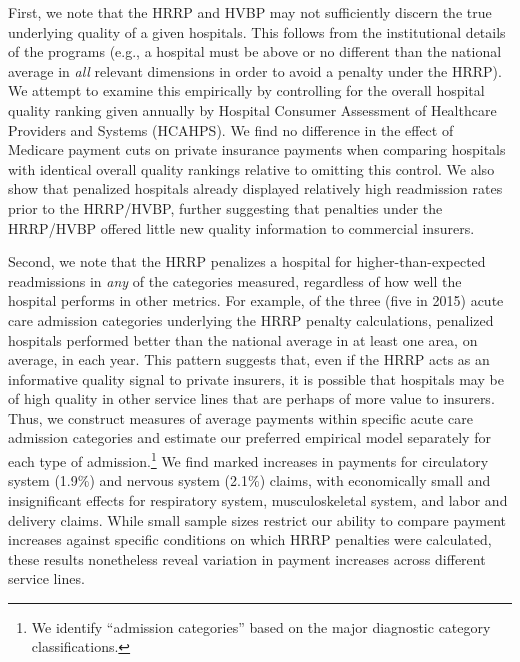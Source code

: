 \documentclass[12pt]{article}
\begin{document}
First, we note that the HRRP and HVBP may not sufficiently discern the true underlying quality of a given hospitals. This follows from the institutional details of the programs (e.g., a hospital must be above or no different than the national average in \textit{all} relevant dimensions in order to avoid a penalty under the HRRP). We attempt to examine this empirically by controlling for the overall hospital quality ranking given annually by Hospital Consumer Assessment of Healthcare Providers and Systems (HCAHPS). We find no difference in the effect of Medicare payment cuts on private insurance payments when comparing hospitals with identical overall quality rankings relative to omitting this control. We also show that penalized hospitals already displayed relatively high readmission rates prior to the HRRP/HVBP, further suggesting that penalties under the HRRP/HVBP offered little new quality information to commercial insurers.

Second, we note that the HRRP penalizes a hospital for higher-than-expected readmissions in \textit{any} of the categories measured, regardless of how well the hospital performs in other metrics. For example, of the three (five in 2015) acute care admission categories underlying the HRRP penalty calculations, penalized hospitals performed better than the national average in at least one area, on average, in each year. This pattern suggests that, even if the HRRP acts as an informative quality signal to private insurers, it is possible that hospitals may be of high quality in other service lines that are perhaps of more value to insurers. Thus, we construct measures of average payments within specific acute care admission categories and estimate our preferred empirical model separately for each type of admission.\footnote{We identify ``admission categories'' based on the major diagnostic category classifications.} We find marked increases in payments for circulatory system (1.9$\%$) and nervous system (2.1$\%$) claims, with economically small and insignificant effects for respiratory system, musculoskeletal system, and labor and delivery claims. While small sample sizes restrict our ability to compare payment increases against specific conditions on which HRRP penalties were calculated, these results nonetheless reveal variation in payment increases across different service lines.
\end{document}
